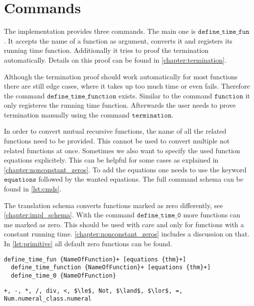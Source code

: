 

\section{Commands}\label{chapter:commands}

The implementation provides three commands.
The main one is $\texttt{define\_time\_fun}$.
It accepts the name of a function as argument, converts it and registers its running time function.
Additionally it tries to proof the termination automatically.
Details on this proof can be found in \autoref{chapter:termination}.

Although the termination proof should work automatically for most functions there are still edge cases, where it takes up too much time or even fails.
Therefore the command $\texttt{define\_time\_function}$ exists.
Similar to the command $\texttt{function}$ it only registeres the running time function.
Afterwards the user needs to prove termination manually using the command $\texttt{termination}$.

In order to convert mutual recursive functions, the name of all the related functions need to be provided.
This cannot be used to convert multiple not related functions at once.
Sometimes we also want to specify the used function equations explicitely.
This can be helpful for some cases as explained in \autoref{chapter:nonconstant_zeros}.
To add the equations one needs to use the keyword $\texttt{equations}$ followed by the wanted equations.
The full command schema can be found in \autoref{lst:cmds}.

The translation schema converts functions marked as zero differently, see \autoref{chapter:impl_schema}.
With the command $\texttt{define\_time\_0}$ more functions can me marked as zero.
This should be used with care and only for functions with a constant running time.
\autoref{chapter:nonconstant_zeros} includes a discussion on that.
In \autoref{lst:primitive} all default zero functions can be found.

\begin{lstlisting}[float,label=lst:cmds,caption=Schema of implemented command]
  define_time_fun {NameOfFunction}+ [equations {thm}+]
  define_time_function {NameOfFunction}+ [equations {thm}+]
  define_time_0 {NameOfFunction}
\end{lstlisting}

\begin{lstlisting}[float,label=lst:primitive,caption=Zero functions by default,mathescape=true]
  +, -, *, /, div, <, $\le$, Not, $\land$, $\lor$, =, Num.numeral_class.numeral
\end{lstlisting}

